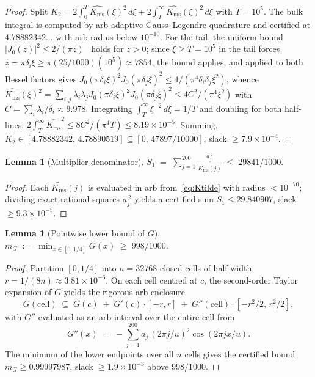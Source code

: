 \documentclass[11pt, letterpaper]{article}
\theoremstyle{paperplain}
\newtheorem{lemma}[theorem]{Lemma}
\theoremstyle{paperdef}
\newcommand{\Kms}{K_{\mathrm{ms}}}
\begin{document}
\begin{proof}
Split
$K_2 = 2\int_0^{T}\widehat{\Kms}(\xi)^2\,d\xi
+ 2\int_{T}^{\infty}\widehat{\Kms}(\xi)^2\,d\xi$ with $T=10^{5}$.
The bulk integral is computed by arb adaptive Gauss--Legendre
quadrature and certified at $4.78882342\ldots$ with arb radius
below $10^{-10}$.  For the tail, the uniform bound
$|J_0(z)|^2\le 2/(\pi z)$~\cite{Watson} holds for $z>0$;
since $\xi\ge T=10^{5}$ in the tail forces $z=\pi\delta_i\xi\ge
\pi(25/1000)(10^{5})\approx 7854$, the bound applies, and applied to
both Bessel factors gives
$J_0(\pi\delta_i\xi)^2 J_0(\pi\delta_j\xi)^2
\le 4/(\pi^4\delta_i\delta_j\xi^2)$, whence
$\widehat{\Kms}(\xi)^2 = \sum_{i,j}\lambda_i\lambda_j
   J_0(\pi\delta_i\xi)^2 J_0(\pi\delta_j\xi)^2
\le 4C^2/(\pi^4\xi^2)$ with
$C=\sum_i\lambda_i/\delta_i\approx 9.978$.  Integrating
$\int_T^\infty \xi^{-2}\,d\xi = 1/T$ and doubling for both half-lines,
$2\int_T^\infty\widehat{\Kms}^2 \le 8C^2/(\pi^4 T) \le 8.19\times 10^{-5}$.
Summing,
$K_2\in[4.78882342,\,4.78890519]\subseteq[0,\,47897/10000]$, slack
$\ge 7.9\times 10^{-4}$.
\end{proof}

\begin{lemma}[Multiplier denominator]
\label{lem:S1}
\(
  S_1 \;=\;
  \sum_{j=1}^{200}\frac{a_j^{\,2}}{\widetilde{\Kms}(j)}
  \;\le\; 29841/1000.
\)
\end{lemma}

\begin{proof}
Each $\widetilde{\Kms}(j)$ is evaluated in arb from~\eqref{eq:Ktilde}
with radius $<10^{-70}$; dividing exact rational squares $a_j^{\,2}$
yields a certified sum $S_1\le 29.840907$, slack
$\ge 9.3\times 10^{-5}$.
\end{proof}

\begin{lemma}[Pointwise lower bound of $G$]
\label{lem:mG}
\(
  m_G \;:=\; \min_{x\in[0,1/4]}G(x) \;\ge\; 998/1000.
\)
\end{lemma}

\begin{proof}
Partition $[0,1/4]$ into $n=32768$ closed cells of half-width
$r=1/(8n)\approx 3.81\times 10^{-6}$.  On each cell centred at $c$,
the second-order Taylor expansion of $G$ yields the rigorous arb
enclosure
\[
  G(\mathrm{cell})\;\subseteq\;
    G(c)\;+\;G'(c)\cdot[-r,r]\;+\;G''(\mathrm{cell})\cdot[-r^{2}/2,\,r^{2}/2],
\]
with $G''$ evaluated as an arb interval over the entire cell from
\[
  G''(x) \;=\; -\sum_{j=1}^{200}a_j\,(2\pi j/u)^{2}\cos(2\pi jx/u).
\]
The minimum of the lower endpoints over all $n$ cells gives the
certified bound $m_G\ge 0.99997987$, slack $\ge 1.9\times 10^{-3}$
above $998/1000$.
\end{proof}
\end{document}
